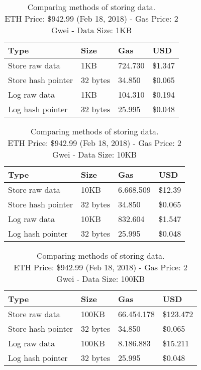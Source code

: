 \begin{table}[!htb]
  \centering
  \begin{tabular}{|l|l|l|l|}
  \hline
    Type & Size & Gas  & USD \\ \hline
    Store raw data & 1KB & 724.730  & \$1.347 \\ \hline
    Store hash pointer & 32 bytes & 34.850  & \$0.065 \\ \hline
    Log raw data & 1KB & 104.310  & \$0.194 \\ \hline
    Log hash pointer & 32 bytes & 25.995  & \$0.048 \\ \hline
  \end{tabular}
  \captionsetup{format=hang, justification=centering}
  \caption{Comparing methods of storing data.\\ ETH Price: \$942.99 (Feb 18, 2018) - Gas Price: 2 Gwei - Data Size: 1KB}
  \label{table:data_store_comparison_02}
\end{table}

\begin{table}[!htb]
  \centering
  \begin{tabular}{|l|l|l|l|}
    \hline
      Type & Size & Gas  & USD \\ \hline
      Store raw data & 10KB & 6.668.509  & \$12.39 \\ \hline
      Store hash pointer & 32 bytes & 34.850  & \$0.065 \\ \hline
      Log raw data & 10KB & 832.604  & \$1.547 \\ \hline
      Log hash pointer & 32 bytes & 25.995  & \$0.048 \\ \hline
  \end{tabular}
  \captionsetup{format=hang, justification=centering}
  \caption{Comparing methods of storing data.\\ ETH Price: \$942.99 (Feb 18, 2018) - Gas Price: 2 Gwei - Data Size: 10KB}
  \label{table:data_store_comparison_03}
\end{table}

\begin{table}[!htb]
  \centering
  \begin{tabular}{|l|l|l|l|}
    \hline
    Type & Size & Gas  & USD \\ \hline
    Store raw data & 100KB & 66.454.178  & \$123.472 \\ \hline
    Store hash pointer & 32 bytes & 34.850  & \$0.065 \\ \hline
    Log raw data & 100KB & 8.186.883  & \$15.211 \\ \hline
    Log hash pointer & 32 bytes & 25.995  & \$0.048 \\ \hline
  \end{tabular}
  \captionsetup{format=hang, justification=centering}
  \caption{Comparing methods of storing data.\\ ETH Price: \$942.99 (Feb 18, 2018) - Gas Price: 2 Gwei - Data Size: 100KB}
  \label{table:data_store_comparison_04}
\end{table}


